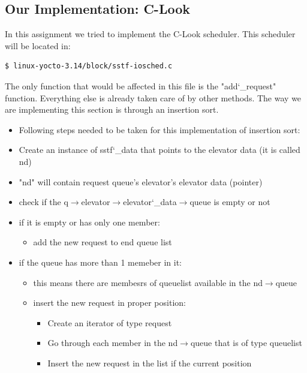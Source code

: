 \documentclass[journal,10pt,onecolumn,compsoc,letterpaper,draftclsnofoot,table,xcdraw]{IEEEtran} \usepackage[margin=0.75in]{geometry}
\begin{document}
\subsection{Our Implementation: C-Look}
\noindent In this assignment we tried to implement the C-Look scheduler. This scheduler will be located in:
\begin{verbatim}
$ linux-yocto-3.14/block/sstf-iosched.c
\end{verbatim}
\noindent The only function that would be affected in this file is the "add\char`_request" function. Everything else is already taken care of by other methods. The way we are implementing this section is through an insertion sort.
\begin{itemize}
\item Following steps needed to be taken for this implementation of insertion sort:
\item Create an instance of sstf\char`_data that points to the elevator data (it is called nd)
\item "nd" will contain request queue's elevator's elevator data (pointer)
\item check if the q$\rightarrow$elevator$\rightarrow$elevator\char`_data$\rightarrow$queue is empty or not
\item if it is empty or has only one member:
	\begin{itemize}
	\item add the new request to end queue list
	\end{itemize}
\item if the queue has more than 1 memeber in it:
	\begin{itemize}
	\item this means there are membesrs of queuelist available in the nd$\rightarrow$queue
    \item insert the new request in proper position:
   		\begin{itemize}
		\item Create an iterator of type request
        \item Go through each member in the nd$\rightarrow$queue that is of type queuelist
        \item Insert the new request in the list if the current position
		\end{itemize}
	\end{itemize}
\end{itemize}
\end{document}

